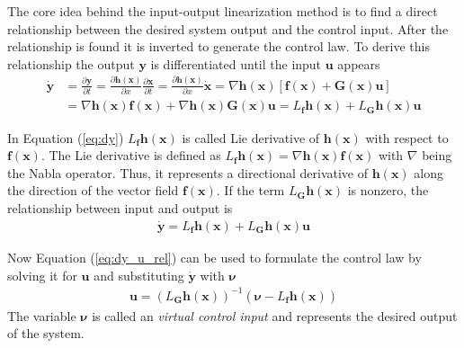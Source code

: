 \documentclass[11pt, a4paper, twoside]{report}
\begin{document}
The core idea behind the input-output linearization method is to find a direct relationship between the desired system output and the control input. After the relationship is found it is inverted to generate the control law. To derive this relationship the output $\bm{y}$ is differentiated until the input $\bm{u}$ appears
\begin{equation}
	\begin{split}
		\bm{\dot{y}} &=  \frac{\partial\bm{y}}{\partial t} = \frac{\partial\bm{h}(\bm{x})}{\partial x} \frac{\partial\bm{x}}{\partial t} = \frac{\partial\bm{h}(\bm{x})}{\partial x} \dot{\bm{x}} = \nabla\bm{h}(\bm{x}) [\bm{f}(\bm{x}) + \bm{G}(\bm{x})\bm{u}] \\
		&= \nabla\bm{h}(\bm{x}) \bm{f}(\bm{x}) + \nabla\bm{h}(\bm{x}) \bm{G}(\bm{x})\bm{u} = L_{\bm{f}} \bm{h}(\bm{x}) + L_{\bm{G}} \bm{h}(\bm{x}) \bm{u} 
		\label{eq:dy}
	\end{split}
\end{equation}

In Equation (\ref{eq:dy}) $L_{\bm{f}} \bm{h}(\bm{x})$ is called Lie derivative of $\bm{h}(\bm{x})$ with respect to $\bm{f}(\bm{x})$. The Lie derivative is defined as $L_{\bm{f}} \bm{h}(\bm{x}) = \nabla\bm{h}(\bm{x}) \bm{f}(\bm{x})$ with $\nabla$ being the Nabla operator. Thus, it represents a directional derivative of $\bm{h}(\bm{x})$ along the direction of the vector field $\bm{f}(\bm{x})$. If the term $L_{\bm{G}} \bm{h}(\bm{x})$ is nonzero, the relationship between input and output is
\begin{equation}
	\begin{split}
		\bm{\dot{y}} = L_{\bm{f}} \bm{h}(\bm{x}) + L_{\bm{G}} \bm{h}(\bm{x}) \bm{u} 
		\label{eq:dy_u_rel}
	\end{split}
\end{equation}

Now Equation (\ref{eq:dy_u_rel}) can be used to formulate the control law by solving it for $\bm{u}$ and substituting $\bm{\dot{y}}$ with $\bm{\nu}$
\begin{equation}
	\begin{split}
		\bm{u} = (L_{\bm{G}}\bm{h}(\bm{x}))^{-1} (\bm{\nu} - L_{\bm{f}}\bm{h}(\bm{x}))
		\label{eq:u_control_law}
	\end{split}
\end{equation}
The variable $\bm{\nu}$ is called an \textit{virtual control input} and represents the desired output of the system. 
\end{document}

